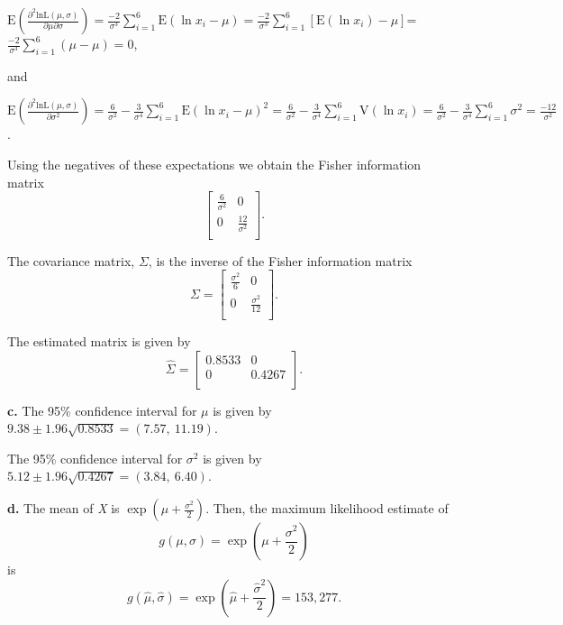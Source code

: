 \documentclass[]{book}
\theoremstyle{definition}
\theoremstyle{definition}
\theoremstyle{definition}
\theoremstyle{remark}
\begin{document}
\(\mathrm{E}\left( \frac{\partial^{2}\text{lnL}\left( \mu,\sigma \right)}{\partial\mu\partial\sigma} \right) = \frac{- 2}{\sigma^{3}}\sum_{i = 1}^{6}{\mathrm{E}\left( \ln x_{i} - \mu \right)} = \frac{- 2}{\sigma^{3}}\sum_{i = 1}^{6}\left\lbrack \mathrm{E}\left( \ln x_{i} \right) - \mu \right\rbrack\)=\(\frac{- 2}{\sigma^{3}}\sum_{i = 1}^{6}\left( \mu - \mu \right) = 0\),

and

\(\mathrm{E}\left( \frac{\partial^{2}\text{lnL}\left( \mu,\sigma \right)}{\partial\sigma^{2}} \right) = \frac{6}{\sigma^{2}} - \frac{3}{\sigma^{4}}\sum_{i = 1}^{6}{\mathrm{E}\left( \ln x_{i} - \mu \right)}^{2} = \frac{6}{\sigma^{2}} - \frac{3}{\sigma^{4}}\sum_{i = 1}^{6}{\mathrm{V}\left( \ln x_{i} \right) = \frac{6}{\sigma^{2}} - \frac{3}{\sigma^{4}}\sum_{i = 1}^{6}{\sigma^{2} = \frac{- 12}{\sigma^{2}}}}\).

Using the negatives of these expectations we obtain the Fisher
information matrix \[\begin{bmatrix}
\frac{6}{\sigma^{2}} & 0 \\
0 & \frac{12}{\sigma^{2}} \\
\end{bmatrix}.\]

The covariance matrix, \(\Sigma\), is the inverse of the Fisher
information matrix \[\Sigma = \begin{bmatrix}
\frac{\sigma^{2}}{6} & 0 \\
0 & \frac{\sigma^{2}}{12} \\
\end{bmatrix}.\]

The estimated matrix is given by \[\hat{\Sigma} = \begin{bmatrix}
0.8533 & 0 \\
0 & 0.4267 \\
\end{bmatrix}.\]

\textbf{c.} The 95\% confidence interval for \(\mu\) is given by
\(9.38 \pm 1.96\sqrt{0.8533} = \left( 7.57,\ 11.19 \right)\).

The 95\% confidence interval for \(\sigma^{2}\) is given by
\(5.12 \pm 1.96\sqrt{0.4267} = \left( 3.84,\ 6.40 \right)\).

\textbf{d.} The mean of \emph{X} is
\(\exp\left( \mu + \frac{\sigma^{2}}{2} \right)\). Then, the maximum
likelihood estimate of
\[g\left( \mu,\sigma \right) = \exp\left( \mu + \frac{\sigma^{2}}{2} \right)\]
is
\[g\left( \hat{\mu},\hat{\sigma} \right) = \exp\left( \hat{\mu} + \frac{{\hat{\sigma}}^{2}}{2} \right) = 153,277.\]
\end{document}
